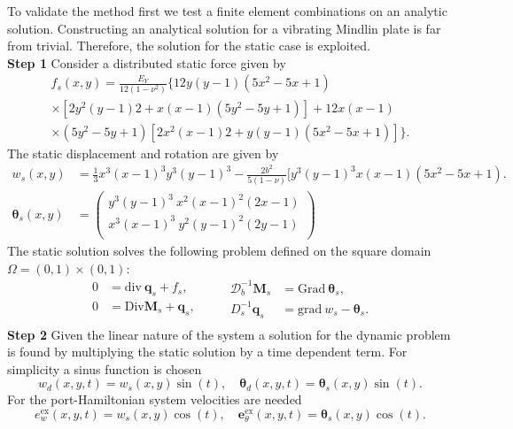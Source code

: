 To validate the method first we test a finite element combinations on an analytic solution. Constructing an analytical solution for a vibrating Mindlin plate is far from trivial. Therefore, the solution for the static case \cite{veiga2013} is exploited. \\
\textbf{Step 1 } Consider a distributed static force given by 
\begin{equation*}
\begin{aligned}
f_s(x,y)=\frac{E_Y}{12 (1-\nu^2)} \{12 y(y-1)(5x^2-5x+1) \\
\times [2y^2(y-1)2+x(x-1)(5y^2-5y+1)] +12x(x-1)\\
\times (5y^2-5y+1)[2x^2(x-1)2+y(y-1)(5x^2-5x+1)]\}.
\end{aligned}
\end{equation*}
The static displacement and rotation are given by
\begin{align*}
w_s(x,y) &= \frac{1}{3} x^3(x-1)^3 y^3 (y-1)^3 -\frac{2 b^2}{5(1-\nu)}[y^3(y-1)^3 x(x-1)(5 x^2-5x+1). \\
\bm{\theta}_{s}(x,y) &= 
\begin{pmatrix}
y^3(y-1)^3 \ x^2 (x-1)^2 (2x-1) \\
x^3(x-1)^3 \ y^2 (y-1)^2 (2y-1) \\
\end{pmatrix}
\end{align*}
The static solution solves the following problem defined on the square domain $\Omega=(0,1)\times(0,1)$:
\begin{equation}
\begin{aligned}
0 &= \mathrm{div} \ \bm{q}_s + f_s , \\
0 &= \mathrm{Div} \bm{M}_s + \bm{q}_s, \\
\end{aligned} \qquad
\begin{aligned}
\bm{\mathcal{D}}_b^{-1} \bm{M}_s &= \mathrm{Grad} \ \bm{\theta}_s, \\
D_s^{-1} \bm{q}_s &= \mathrm{grad} \ w_s - \bm{\theta}_s. \\
\end{aligned}
\end{equation}
\textbf{Step 2 } Given the linear nature of the system a solution for the dynamic problem is found by multiplying the static solution by a time dependent term. For simplicity a sinus function is chosen
\[
w_d(x,y,t) = w_s(x,y) \sin(t), \quad \bm{\theta}_d(x,y,t) = \bm\theta_s(x,y) \sin(t).
\]
For the port-Hamiltonian system velocities are needed
\[
e_w^\text{ex}(x,y,t) = w_s(x,y) \cos(t), \quad \bm{e}_\theta^\text{ex}(x,y,t) = \bm\theta_s(x,y) \cos(t).
\]
